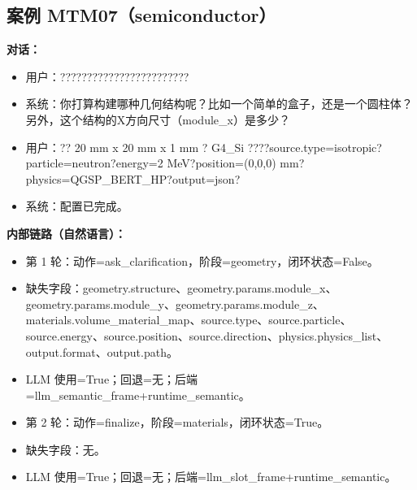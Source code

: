 \documentclass[11pt]{ctexart}
\begin{document}
\subsection{案例 MTM07（semiconductor）}
\textbf{对话：}
\begin{itemize}
\item 用户：????????????????????????
\item 系统：你打算构建哪种几何结构呢？比如一个简单的盒子，还是一个圆柱体？另外，这个结构的X方向尺寸（module\_x）是多少？
\item 用户：?? 20 mm x 20 mm x 1 mm ? G4\_Si ????source.type=isotropic?particle=neutron?energy=2 MeV?position=(0,0,0) mm?physics=QGSP\_BERT\_HP?output=json?
\item 系统：配置已完成。
\end{itemize}
\textbf{内部链路（自然语言）：}
\begin{itemize}
\item 第 1 轮：动作=ask\_clarification，阶段=geometry，闭环状态=False。
\item 缺失字段：geometry.structure、geometry.params.module\_x、geometry.params.module\_y、geometry.params.module\_z、materials.volume\_material\_map、source.type、source.particle、source.energy、source.position、source.direction、physics.physics\_list、output.format、output.path。
\item LLM 使用=True；回退=无；后端=llm\_semantic\_frame+runtime\_semantic。
\item 第 2 轮：动作=finalize，阶段=materials，闭环状态=True。
\item 缺失字段：无。
\item LLM 使用=True；回退=无；后端=llm\_slot\_frame+runtime\_semantic。
\end{itemize}
\end{document}
